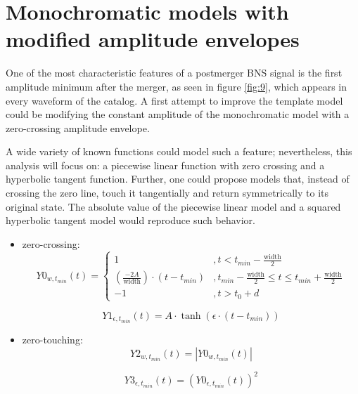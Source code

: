 \newpage
\section{Monochromatic models with modified amplitude envelopes}\label{zc-aenv}
One of the most characteristic features of a postmerger BNS signal is the first amplitude minimum after the merger, as seen in figure \ref{fig:9}, which appears in every waveform of the catalog. A first attempt to improve the template model could be modifying the constant amplitude of the monochromatic model with a zero-crossing amplitude envelope. 

A wide variety of known functions could model such a feature; nevertheless, this analysis will focus on: a piecewise linear function with zero crossing and a hyperbolic tangent function. Further, one could propose models that, instead of crossing the zero line, touch it tangentially and return symmetrically to its original state. The absolute value of the piecewise linear model and a squared hyperbolic tangent model would reproduce such behavior.

\vspace{1cm}

\begin{itemize}
\item zero-crossing:
\begin{equation}\label{line}
Y0_{w, t_{min}}(t) =
\begin{cases} 
      1 &, t<t_{min}-\mathrm{\frac{width}{2}} \\
      \left( \frac{-2A}{\mathrm{width}} \right) \cdot (t- t_{min}) &, t_{min}-\mathrm{\frac{width}{2}} \leq t \leq t_{min}+\mathrm{\frac{width}{2}} \\
     -1 &, t>t_{0}+d
   \end{cases}
\end{equation}

\begin{equation}\label{tanh}
Y1_{\epsilon, t_{min}}(t) = A \cdot \tanh (\epsilon \cdot(t-t_{min}))
\end{equation}

\vspace{0.5cm}


\item zero-touching:
\begin{equation}\label{line-abs}
Y2_{w, t_{min}}(t) = \left| Y0_{w, t_{min}}(t) \right|
\end{equation}

\begin{equation}\label{tanh2}
Y3_{\epsilon, t_{min}}(t) = \left( Y0_{\epsilon, t_{min}}(t) \right)^2
\end{equation}

\end{itemize}

